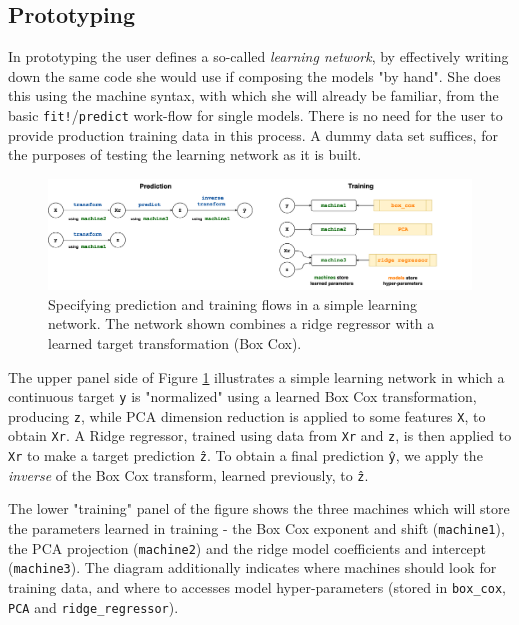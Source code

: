\documentclass{article}
\begin{document}
\subsection{Prototyping}

In prototyping the user defines a so-called \textit{learning network},
by effectively writing down the same code she would use if composing
the models "by hand". She does this using the machine syntax, with
which she will already be familiar, from the basic
\texttt{fit!}/\texttt{predict} work-flow for single models. There is
no need for the user to provide production training data in this
process. A dummy data set suffices, for the purposes of testing the
learning network as it is built.

\begin{figure}
  \centering
  \mbox{\hspace{0.02\textwidth}}\includegraphics[width=1.05\textwidth]{target_transformer}
  \caption{Specifying prediction and training flows in a simple
    learning network. The network shown combines a ridge regressor
    with a learned target transformation (Box Cox).}
  \label{fig:fig2}
\end{figure}

The upper panel side of Figure \ref{fig:fig2} illustrates a simple
learning network in which a continuous target \texttt{y} is
"normalized" using a learned Box Cox transformation, producing
\texttt{z}, while PCA dimension reduction is applied to some features
\texttt{X}, to obtain \texttt{Xr}. A Ridge regressor, trained using
data from \texttt{Xr} and \texttt{z}, is then applied to \texttt{Xr}
to make a target prediction \texttt{\^{z}}. To obtain a final
prediction \texttt{\^{y}}, we apply the \textit{inverse} of the Box
Cox transform, learned previously, to \texttt{\^{z}}.

The lower "training" panel of the figure shows the three machines
which will store the parameters learned in training - the Box Cox
exponent and shift (\texttt{machine1}), the PCA projection
(\texttt{machine2}) and the ridge model coefficients and intercept
(\texttt{machine3}). The diagram additionally indicates where machines
should look for training data, and where to accesses model
hyper-parameters (stored in \texttt{box\_cox}, \texttt{PCA} and
\texttt{ridge\_regressor}).
\end{document}
